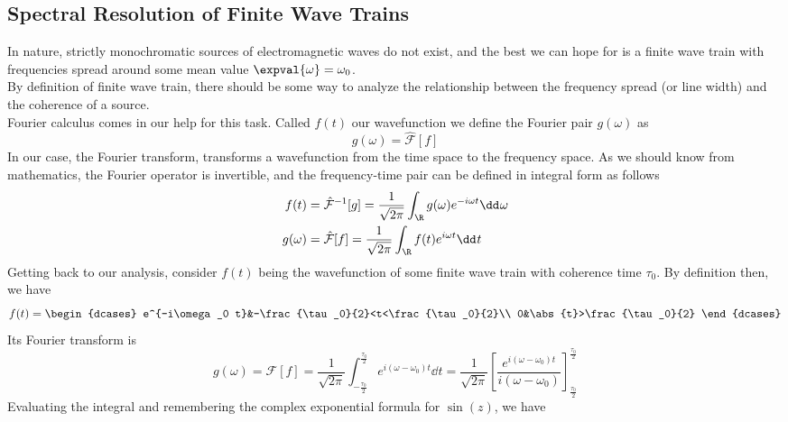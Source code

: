 \documentclass[../electromagnetism.tex]{subfiles}
\begin{document}
\subsection{Spectral Resolution of Finite Wave Trains}
In nature, strictly monochromatic sources of electromagnetic waves do not exist, and the best we can hope for is a finite wave train with frequencies spread around some mean value $\expval{\omega}=\omega_0$.\\
By definition of finite wave train, there should be some way to analyze the relationship between the frequency spread (or line width) and the coherence of a source.\\
Fourier calculus comes in our help for this task. Called $f(t)$ our wavefunction we define the Fourier pair $g(\omega)$ as 
\begin{equation*}
	g(\omega)=\hat{\mathcal{F}}[f]
\end{equation*}
In our case, the Fourier transform, transforms a wavefunction from the time space to the frequency space. As we should know from mathematics, the Fourier operator is invertible, and the frequency-time pair can be defined in integral form as follows
\begin{equation*}
	\begin{aligned}
		f(t)&=\hat{\mathcal{F}}^{-1}[g]=\frac{1}{\sqrt{2\pi}}\int_{\R}^{}g(\omega)e^{-i\omega t}\dd^{}{\omega}\\
		g(\omega)&=\hat{\mathcal{F}}[f]=\frac{1}{\sqrt{2\pi}}\int_{\R}^{}f(t)e^{i\omega t}\dd^{}{t}
	\end{aligned}
\end{equation*}
Getting back to our analysis, consider $f(t)$ being the wavefunction of some finite wave train with coherence time $\tau_0$. By definition then, we have
\begin{equation}
	f(t)=\begin{dcases}
		e^{-i\omega_0 t}&-\frac{\tau_0}{2}<t<\frac{\tau_0}{2}\\
		0&\abs{t}>\frac{\tau_0}{2}
	\end{dcases}
	\label{eq:wavetrainfourier}
\end{equation}
Its Fourier transform is
\begin{equation}
	g(\omega)=\mathcal{F}[f]=\frac{1}{\sqrt{2\pi}}\int_{-\frac{\tau_0}{2}}^{\frac{\tau_0}{2}}e^{i(\omega-\omega_0)t}\dd^{}{t}=\frac{1}{\sqrt{2\pi}}\left[ \frac{e^{i(\omega-\omega_0)t}}{i(\omega-\omega_0)} \right]^{\frac{\tau_0}{2}}_{\frac{\tau_0}{2}}
	\label{eq:gomega1}
\end{equation}
Evaluating the integral and remembering the complex exponential formula for $\sin(z)$, we have
\end{document}
